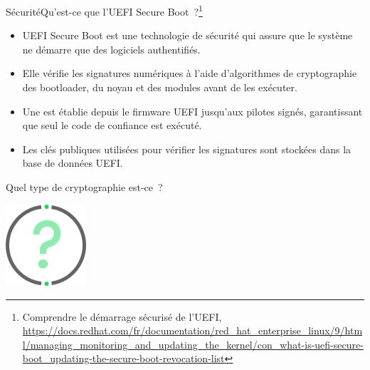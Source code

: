 \documentclass{beamer}
\begin{document}
    \begin{frame}{Sécurité}{Qu'est-ce que l'UEFI Secure Boot~?\footnote{\label{uefi}Comprendre le démarrage sécurisé de l'UEFI, \url{https://docs.redhat.com/fr/documentation/red\_hat\_enterprise\_linux/9/html/managing\_monitoring\_and\_updating\_the\_kernel/con\_what-is-uefi-secure-boot\_updating-the-secure-boot-revocation-list}}}
        \begin{small}
            \begin{itemize}
                \item UEFI Secure Boot est une technologie de sécurité qui assure que le système ne démarre que des logiciels authentifiés.
                \item Elle vérifie les signatures numériques à l'aide d'algorithmes de cryptographie des bootloader, du noyau et des modules avant de les exécuter.
                \item Une  est établie depuis le firmware UEFI jusqu'aux pilotes signés, garantissant que seul le code de confiance est exécuté.
                \item Les clés publiques utilisées pour vérifier les signatures sont stockées dans la base de données UEFI.
            \end{itemize}
            Quel type de cryptographie est-ce~?
            \begin{center}
                \includegraphics[width=3cm]{image/question-mark}
            \end{center}
        \end{small}
    \end{frame}
\end{document}
